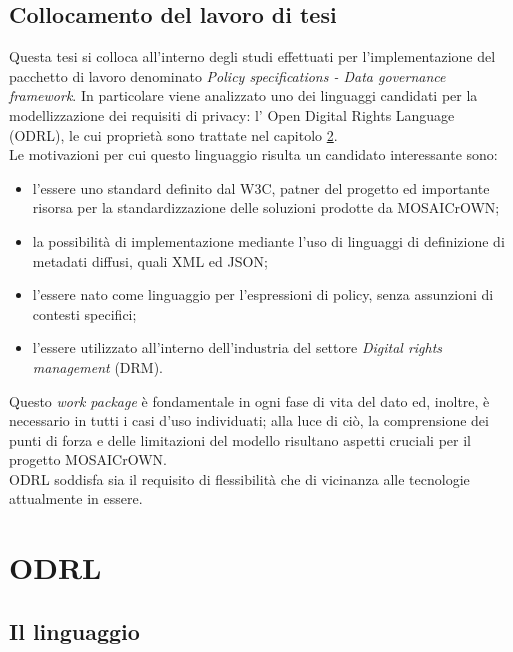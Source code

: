 \documentclass[12pt,a4paper,twoside]{book}
\begin{document}
\section{Collocamento del lavoro di tesi}
Questa tesi si colloca all'interno degli studi effettuati per l'implementazione del pacchetto di lavoro denominato \textit{Policy specifications - Data governance framework}. In particolare viene analizzato uno dei linguaggi candidati per la modellizzazione dei requisiti di privacy: l' Open Digital Rights Language (ODRL), le cui proprietà sono trattate nel capitolo \ref{ODRLChapter}.\\
Le motivazioni per cui questo linguaggio risulta un candidato interessante sono:
\begin{itemize}
\item l'essere uno standard definito dal W3C, patner del progetto ed importante risorsa per la standardizzazione delle soluzioni prodotte da MOSAICrOWN;
\item la possibilità di implementazione mediante l'uso di linguaggi di definizione di metadati diffusi, quali XML ed JSON;
\item l'essere nato come linguaggio per l'espressioni di policy, senza assunzioni di contesti specifici;
\item l'essere utilizzato all'interno dell'industria del settore \textit{Digital rights management} (DRM).
\end{itemize}
Questo \textit{work package} è fondamentale in ogni fase di vita del dato ed, inoltre, è necessario in tutti i casi d'uso individuati; alla luce di ciò, la comprensione dei punti di forza e delle limitazioni del modello risultano aspetti cruciali per il progetto MOSAICrOWN. \\
ODRL soddisfa sia il requisito di flessibilità che di vicinanza alle tecnologie attualmente in essere.
\chapter{ODRL}\label{ODRLChapter} 
\section{Il linguaggio}
\end{document}
